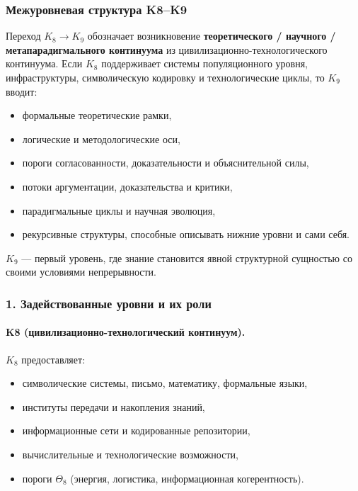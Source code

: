 
\subsubsection{Межуровневая структура K8–K9}
\label{sec:crossk-k8-k9}

Переход $K_8 \rightarrow K_9$ обозначает возникновение
\textbf{теоретического / научного / метапарадигмального континуума} из
цивилизационно-технологического континуума. Если $K_8$ поддерживает
системы популяционного уровня, инфраструктуры, символическую кодировку и
технологические циклы, то $K_9$ вводит:
\begin{itemize}
  \item формальные теоретические рамки,
  \item логические и методологические оси,
  \item пороги согласованности, доказательности и объяснительной силы,
  \item потоки аргументации, доказательства и критики,
  \item парадигмальные циклы и научная эволюция,
  \item рекурсивные структуры, способные описывать нижние уровни и сами себя.
\end{itemize}

$K_9$ — первый уровень, где знание становится явной структурной
сущностью со своими условиями непрерывности.

\subsubsection{1. Задействованные уровни и их роли}

\paragraph{K8 (цивилизационно-технологический континуум).}
$K_8$ предоставляет:
\begin{itemize}
  \item символические системы, письмо, математику, формальные языки,
  \item институты передачи и накопления знаний,
  \item информационные сети и кодированные репозитории,
  \item вычислительные и технологические возможности,
  \item пороги $\Theta_8$ (энергия, логистика, информационная когерентность).
\end{itemize}

